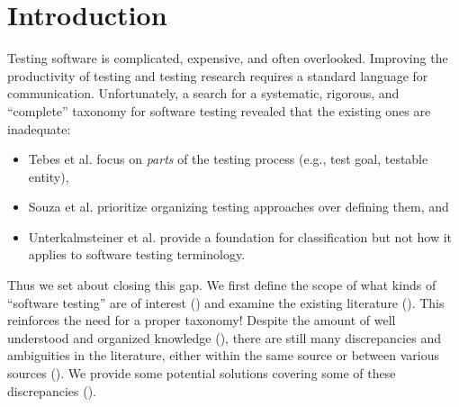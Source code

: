 \section{Introduction}


Testing software is complicated, expensive, and often overlooked.
Improving the productivity of testing and testing research requires a standard
language for communication. Unfortunately, a search
for a systematic, rigorous, and ``complete'' taxonomy for software testing
revealed that the existing ones are inadequate:

\begin{itemize}
    \item \ifnotpaper\else Tebes et al. \fi\citet{TebesEtAl2020a} focus on
          \emph{parts} of the testing process (e.g., test goal, testable entity),
    \item \ifnotpaper\else Souza et al. \fi\citet{SouzaEtAl2017} prioritize
          organizing testing approaches over defining them, and
    \item \ifnotpaper\else Unterkalmsteiner et al. \fi\citet{UnterkalmsteinerEtAl2014}
          provide a foundation for classification but not how it applies to software
          testing terminology.
\end{itemize}

Thus we set about closing this gap. We first define the scope of what kinds of
``software testing'' are of interest () and examine the existing
literature (). This reinforces the need for a proper taxonomy!
Despite the amount of well understood and organized knowledge (),
there are still many discrepancies and ambiguities in the literature, either
within the same source or between various sources (). We provide
some potential solutions covering some of these discrepancies ().